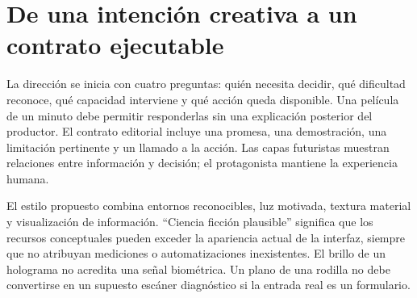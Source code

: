 \def\paperRoman{II}


\begin{abstract}
Se formula la dirección cinematográfica de videos explicativos como un problema jerárquico de restricciones y preferencias. El nivel superior fija propósito, audiencia, evidencia y transformación narrativa; el nivel intermedio selecciona planos y relaciones; el inferior determina encuadre, cámara, iluminación, tipografía y montaje. Se introducen una utilidad multiobjetivo, un grafo de continuidad y una discretización exacta en cuadros. Se deriva una trayectoria de cámara de mínimo jerk con condiciones de posición, velocidad y aceleración en los extremos, y se especifica una interpolación de orientación que evita discontinuidades. La marca se representa mediante tokens y decisiones de composición, conservando por separado información visual y evidencia de producto. El caso de diseño es una película de running donde el descanso declarado cambia la propuesta. Se propone un experimento que compara montaje fijo, planificación clásica y planificación relacional QAF con los mismos recursos. El objetivo es hacer reproducible la dirección sin reducir la calidad artística a una puntuación automática.
\end{abstract}

\section{De una intención creativa a un contrato ejecutable}
La dirección se inicia con cuatro preguntas: quién necesita decidir, qué dificultad reconoce, qué capacidad interviene y qué acción queda disponible. Una película de un minuto debe permitir responderlas sin una explicación posterior del productor. El contrato editorial incluye una promesa, una demostración, una limitación pertinente y un llamado a la acción. Las capas futuristas muestran relaciones entre información y decisión; el protagonista mantiene la experiencia humana.

El estilo propuesto combina entornos reconocibles, luz motivada, textura material y visualización de información. ``Ciencia ficción plausible'' significa que los recursos conceptuales pueden exceder la apariencia actual de la interfaz, siempre que no atribuyan mediciones o automatizaciones inexistentes. El brillo de un holograma no acredita una señal biométrica. Un plano de una rodilla no debe convertirse en un supuesto escáner diagnóstico si la entrada real es un formulario.

